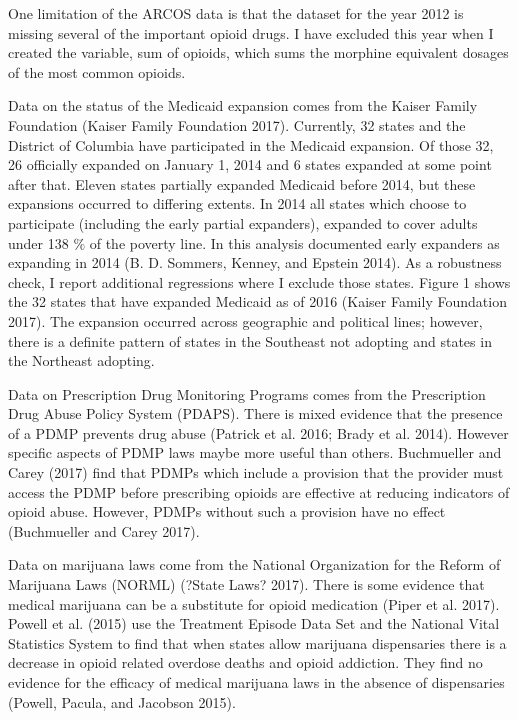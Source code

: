 \documentclass{article}
\begin{document}
One limitation of the ARCOS data is that the dataset for the year 2012 is missing several of the important opioid drugs. I have excluded this year when I created the variable, sum of opioids, which sums the morphine equivalent dosages of the most common opioids.  

Data on the status of the Medicaid expansion comes from the Kaiser Family Foundation (Kaiser Family Foundation 2017).  Currently, 32 states and the District of Columbia have participated in the Medicaid expansion.  Of those 32, 26 officially expanded on January 1, 2014 and 6 states expanded at some point after that. Eleven states partially expanded Medicaid before 2014, but these expansions occurred to differing extents.  In 2014 all states which choose to participate (including the early partial expanders), expanded to cover adults under 138 $\%$ of the poverty line.  In this analysis documented early expanders as expanding in 2014 (B. D. Sommers, Kenney, and Epstein 2014).  As a robustness check, I report additional regressions where I exclude those states.  Figure 1 shows the 32 states that have expanded Medicaid as of 2016 (Kaiser Family Foundation 2017).  The expansion occurred across geographic and political lines; however, there is a definite pattern of states in the Southeast not adopting and states in the Northeast adopting.    

Data on Prescription Drug Monitoring Programs comes from the Prescription Drug Abuse Policy System (PDAPS). There is mixed evidence that the presence of a PDMP prevents drug abuse (Patrick et al. 2016; Brady et al. 2014).  However specific aspects of PDMP laws maybe more useful than others. Buchmueller and Carey (2017) find that PDMPs which include a provision that the provider must access the PDMP before prescribing opioids are effective at reducing indicators of opioid abuse.  However, PDMPs without such a provision have no effect (Buchmueller and Carey 2017).

Data on marijuana laws come from the National Organization for the Reform of Marijuana Laws (NORML) (?State Laws? 2017).  There is some evidence that medical marijuana can be a substitute for opioid medication (Piper et al. 2017).  Powell et al. (2015) use the Treatment Episode Data Set and the National Vital Statistics System to find that when states allow marijuana dispensaries there is a decrease in opioid related overdose deaths and opioid addiction.  They find no evidence for the efficacy of medical marijuana laws in the absence of dispensaries (Powell, Pacula, and Jacobson 2015).
\end{document}
